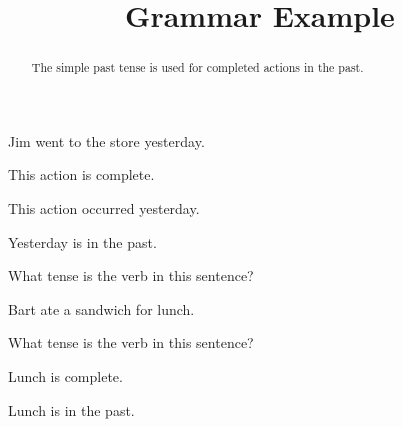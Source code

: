 \documentclass{ximera}
\title{Grammar Example}
\begin{document}
\begin{abstract}
The simple past tense is used for completed actions in the past.
\end{abstract}
\maketitle

\begin{question}
Jim went to the store yesterday.

\begin{solution}
\begin{hint}
This action is complete.
\end{hint}
\begin{hint}
This action occurred yesterday.
\end{hint}
\begin{hint}
Yesterday is in the past.
\end{hint}
What tense is the verb in this sentence?
\end{solution}
\end{question}

\begin{question}
Bart ate a sandwich for lunch.
\begin{solution}
What tense is the verb in this sentence?
\begin{multiple-choice}
\end{multiple-choice}
\begin{hint}
Lunch is complete.
\end{hint}
\begin{hint}
Lunch is in the past.
\end{hint}
\end{solution}
\end{question}
\end{document}
